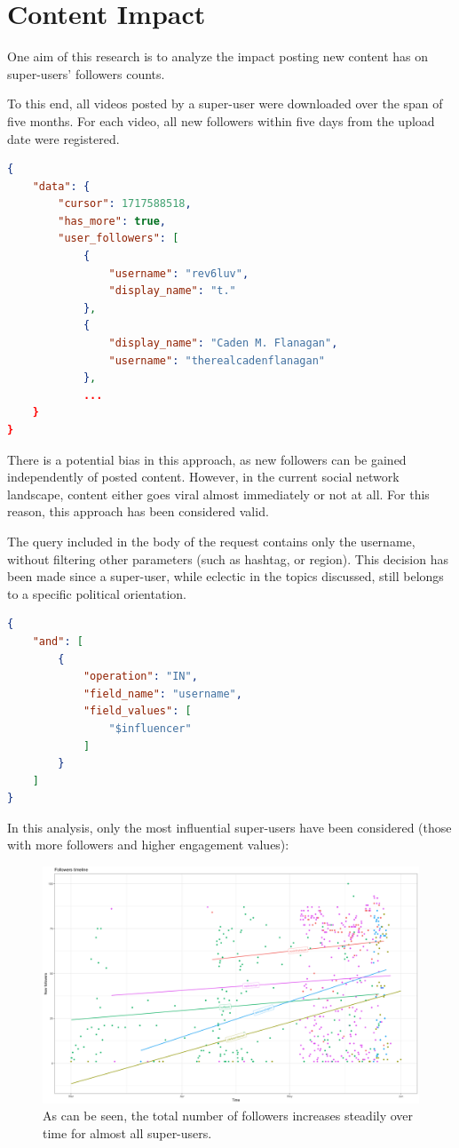 \section{Content Impact}

One aim of this research is to analyze the impact posting new content has on super-users' followers counts.

To this end, all videos posted by a super-user were downloaded over the span of five months. For each video, all new followers within five days from the upload date were registered.

\begin{lstlisting}[language=json]
{
    "data": {
        "cursor": 1717588518,
        "has_more": true,
        "user_followers": [
            {
                "username": "rev6luv",
                "display_name": "t."
            },
            {
                "display_name": "Caden M. Flanagan",
                "username": "therealcadenflanagan"
            },
            ...
    }
} 
\end{lstlisting}

There is a potential bias in this approach, as new followers can be gained independently of posted content. However, in the current social network landscape, content either goes viral almost immediately or not at all. For this reason, this approach has been considered valid.

The query included in the body of the request contains only the username, without filtering other parameters (such as hashtag, or region). This decision has been made since a super-user, while eclectic in the topics discussed, still belongs to a specific political orientation.

\begin{lstlisting}[language=json, label={lst:query}]
{
    "and": [
        {
            "operation": "IN",
            "field_name": "username",
            "field_values": [
                "$influencer" 
            ]
        }
    ]
}
\end{lstlisting}

In this analysis, only the most influential super-users have been considered (those with more followers and higher engagement values):

\begin{figure}[H]
    \centering
    \includegraphics[width = .48\textwidth]{images/Final_Followers_Timeline.png}
    \caption*{As can be seen, the total number of followers increases steadily over time for almost all super-users.}
\end{figure}

